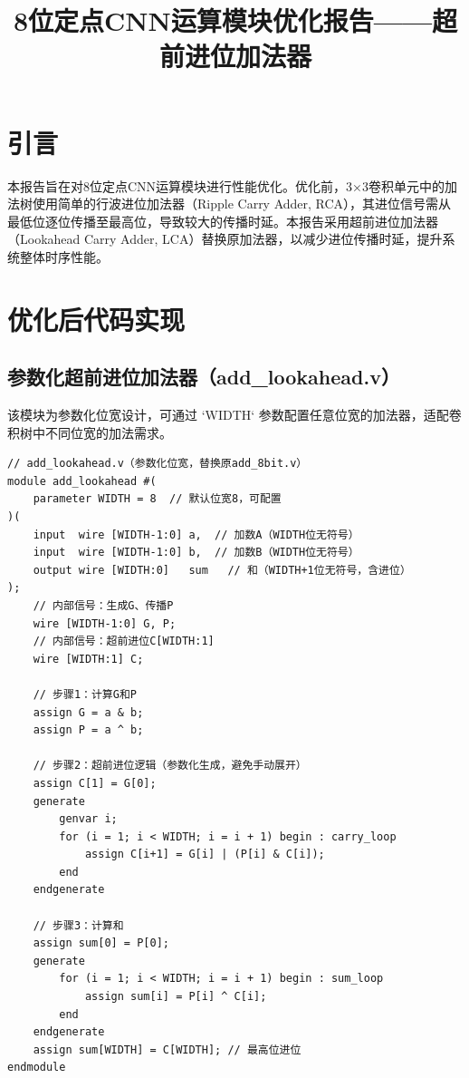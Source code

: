 \documentclass{ctexart}
\title{8位定点CNN运算模块优化报告——超前进位加法器}
\author{}
\date{}
\begin{document}
\maketitle

\section{引言}
本报告旨在对8位定点CNN运算模块进行性能优化。优化前，3×3卷积单元中的加法树使用简单的行波进位加法器（Ripple Carry Adder, RCA），其进位信号需从最低位逐位传播至最高位，导致较大的传播时延。本报告采用超前进位加法器（Lookahead Carry Adder, LCA）替换原加法器，以减少进位传播时延，提升系统整体时序性能。

\section{优化后代码实现}

\subsection{参数化超前进位加法器（add\_lookahead.v）}
该模块为参数化位宽设计，可通过 `WIDTH` 参数配置任意位宽的加法器，适配卷积树中不同位宽的加法需求。
\begin{lstlisting}[style=verilog, caption=add\_lookahead.v]
// add_lookahead.v（参数化位宽，替换原add_8bit.v）
module add_lookahead #(
    parameter WIDTH = 8  // 默认位宽8，可配置
)(
    input  wire [WIDTH-1:0] a,  // 加数A（WIDTH位无符号）
    input  wire [WIDTH-1:0] b,  // 加数B（WIDTH位无符号）
    output wire [WIDTH:0]   sum   // 和（WIDTH+1位无符号，含进位）
);
    // 内部信号：生成G、传播P
    wire [WIDTH-1:0] G, P;
    // 内部信号：超前进位C[WIDTH:1]
    wire [WIDTH:1] C;

    // 步骤1：计算G和P
    assign G = a & b;
    assign P = a ^ b;

    // 步骤2：超前进位逻辑（参数化生成，避免手动展开）
    assign C[1] = G[0];
    generate
        genvar i;
        for (i = 1; i < WIDTH; i = i + 1) begin : carry_loop
            assign C[i+1] = G[i] | (P[i] & C[i]);
        end
    endgenerate

    // 步骤3：计算和
    assign sum[0] = P[0];
    generate
        for (i = 1; i < WIDTH; i = i + 1) begin : sum_loop
            assign sum[i] = P[i] ^ C[i];
        end
    endgenerate
    assign sum[WIDTH] = C[WIDTH]; // 最高位进位
endmodule
\end{lstlisting}
\end{document}
